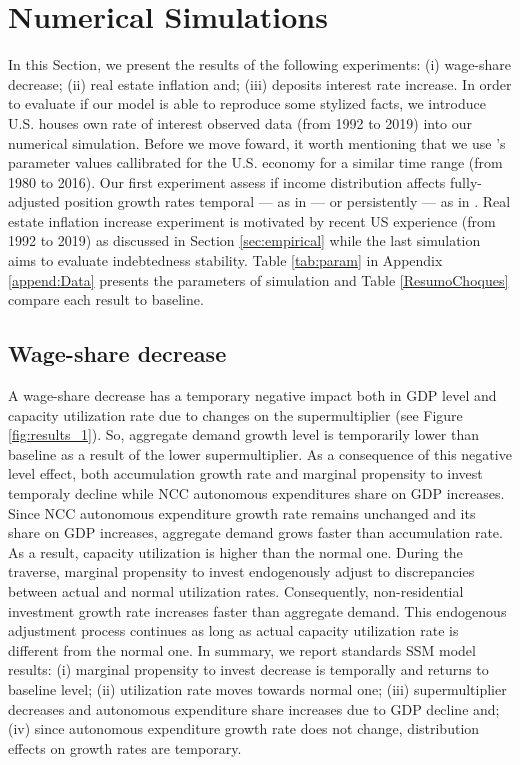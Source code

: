 \documentclass[11pt]{article}
\begin{document}
\section{Numerical Simulations}
\label{sec:org2a26090}
\label{sec:Experiments}
\label{sec:Experiments}


In this Section, we present the results of the following experiments: 
    (i) wage-share decrease;
    (ii) real estate inflation and;
    (iii) deposits interest rate increase.
In order to evaluate if our model is able to reproduce some stylized facts, we introduce U.S. houses own rate of interest observed data (from 1992 to 2019) into our numerical simulation.
Before we move foward, it worth mentioning that we use \citeauthor*{fazzari-2020-deman-led}'s  \citeyear{fazzari-2020-deman-led} parameter values callibrated for the U.S. economy for a similar time range (from 1980 to 2016).
Our first experiment assess if income distribution affects fully-adjusted position growth rates temporal --- as in \textcite{mandarino-2020-worker-debt} --- or persistently ---  as in \textcite{brochier_supermultiplier_2018}.
Real estate inflation increase experiment is motivated by recent US experience (from 1992 to 2019) as discussed in Section \ref{sec:empirical} while the last simulation aims to evaluate indebtedness stability.
Table \ref{tab:param} in Appendix \ref{append:Data} presents the parameters of simulation and Table \ref{ResumoChoques} compare each result to baseline.
\subsection{Wage-share decrease}
\label{sec:org941bb10}
\label{sec:Exp1}

A wage-share decrease has a temporary negative impact both in GDP level and capacity utilization rate due to changes on the supermultiplier (see Figure \ref{fig:results_1}).
So, aggregate demand growth level is temporarily lower than baseline as a result of the lower supermultiplier.
As a consequence of this negative level effect, both accumulation growth rate and marginal propensity to invest temporaly decline while NCC autonomous expenditures share on GDP increases.
Since NCC autonomous expenditure growth rate remains unchanged and its share on GDP increases, aggregate demand grows faster than accumulation rate.
As a result, capacity utilization is higher than the normal one.
During the traverse, marginal propensity to invest endogenously adjust to discrepancies between actual and normal utilization rates.
Consequently, non-residential investment growth rate increases faster than aggregate demand.
This endogenous adjustment process continues as long as actual capacity utilization rate is different from the normal one.
In summary, we report standards SSM model results:
    (i) marginal propensity to invest decrease is temporally and returns to baseline level;
    (ii) utilization rate moves towards normal one;
    (iii) supermultiplier decreases and autonomous expenditure share increases due to GDP decline and; 
    (iv) since autonomous expenditure growth rate does not change, distribution effects on growth rates are temporary. 
\end{document}
